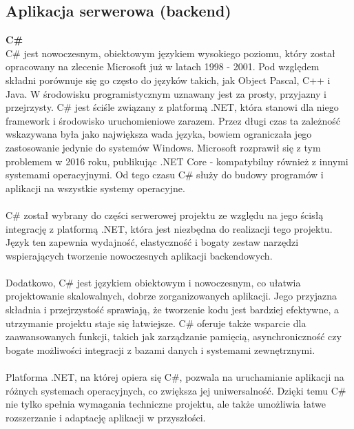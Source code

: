 \documentclass[12pt,a4paper]{article}
\begin{document}
\subsection{Aplikacja serwerowa (backend)}
\noindent \textbf{C\#}\\
C\# jest nowoczesnym, obiektowym językiem wysokiego poziomu, który został opracowany na zlecenie Microsoft już w latach 1998 - 2001. Pod względem składni porównuje się go często do języków takich, jak Object Pascal, C++ i Java. W środowisku programistycznym uznawany jest za prosty, przyjazny i przejrzysty. C\# jest ściśle związany z platformą .NET, która stanowi dla niego framework i środowisko uruchomieniowe zarazem. Przez długi czas ta zależność wskazywana była jako największa wada języka, bowiem ograniczała jego zastosowanie jedynie do systemów Windows. Microsoft rozprawił się z tym problemem w 2016 roku, publikując .NET Core - kompatybilny również z innymi systemami operacyjnymi. Od tego czasu C\# służy do budowy programów i aplikacji na wszystkie systemy operacyjne.
\\\\
C\# został wybrany do części serwerowej projektu ze względu na jego ścisłą integrację z platformą .NET, która jest niezbędna do realizacji tego projektu. Język ten zapewnia wydajność, elastyczność i bogaty zestaw narzędzi wspierających tworzenie nowoczesnych aplikacji backendowych.
\\\\
Dodatkowo, C\# jest językiem obiektowym i nowoczesnym, co ułatwia projektowanie skalowalnych, dobrze zorganizowanych aplikacji. Jego przyjazna składnia i przejrzystość sprawiają, że tworzenie kodu jest bardziej efektywne, a utrzymanie projektu staje się łatwiejsze. C\# oferuje także wsparcie dla zaawansowanych funkcji, takich jak zarządzanie pamięcią, asynchroniczność czy bogate możliwości integracji z bazami danych i systemami zewnętrznymi.
\\\\
Platforma .NET, na której opiera się C\#, pozwala na uruchamianie aplikacji na różnych systemach operacyjnych, co zwiększa jej uniwersalność. Dzięki temu C\# nie tylko spełnia wymagania techniczne projektu, ale także umożliwia łatwe rozszerzanie i adaptację aplikacji w przyszłości.
\\\\
\end{document}
